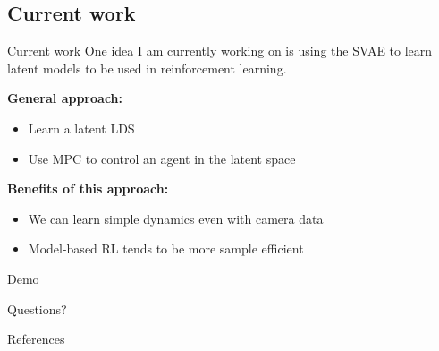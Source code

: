 \documentclass[10pt, compress]{beamer}
\begin{document}
\subsection{Current work}
\begin{frame}{Current work}
  One idea I am currently working on is using the SVAE to learn
  latent models to be used in reinforcement learning\footnotemark.

  \pause
  \textbf{General approach:}
  \begin{itemize}
    \item Learn a latent LDS
    \item Use MPC to control an agent in the latent space
  \end{itemize}

  \pause
  \textbf{Benefits of this approach:}
  \begin{itemize}
      \pause
    \item We can learn simple dynamics even with camera data
      \pause
    \item Model-based RL tends to be more sample efficient
      \pause
  \end{itemize}
  \pause
  \alert{Demo}
\end{frame}

\begin{frame}[standout]
  Questions?
\end{frame}

\appendix
\begin{frame}[allowframebreaks]{References}
  
  
\end{frame}
\end{document}

